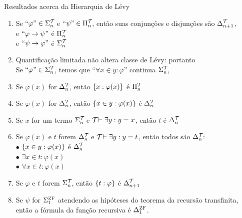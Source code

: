 \begin{theorem}{Resultados acerca da Hierarquia de Lévy}
\begin{enumerate}[label=(\alph*)]
                        \item Se $\text{``}\varphi\text{''}\in\Sigma^{\mathcal{T}_{}}_{n}$ e $\text{``}\psi\text{''}\in\Pi^{\mathcal{T}_{}}_{n}$, então suas conjunções e disjunções
                            são $\Delta^{\mathcal{T}_{}}_{n+1}$,\\ 
                            e $\text{``}\varphi\rightarrow\psi\text{''}$ é $\Pi^{\mathcal{T}_{}}_{n}$\\
                            e $\text{``}\psi\rightarrow\varphi\text{''}$ é $\Sigma^{\mathcal{T}_{}}_{n}$
                        \item Quantificação limitada não altera classe de Lévy: portanto\\
                                Se $\text{``}\varphi\text{''}\in\Sigma^{\mathcal{T}_{}}_{n}$, temos que ``$\forall x\in y:\varphi$'' continua $\Sigma^{\mathcal{T}_{}}_{n}$,
                        \item Se $\varphi(x)$ for         $\Delta^{\mathcal{T}_{}}_{n}$,  então $\SET{x:\varphi(x)}$ é $\Pi^{\mathcal{T}_{}}_{n}$
                        \item Se $\varphi(x)$ for         $\Delta^{\mathcal{T}_{}}_{n}$,  então $\SET{x\in y:\varphi(x)}$ é $\Delta^{\mathcal{T}_{}}_{n}$
                        \item Se $x$ for um termo         $\Sigma^{\mathcal{T}_{}}_{n}$   e $\mathcal{T}_{}\vdash\exists y: y = x$, então $t$ é $\Delta^{\mathcal{T}_{}}_{n}$
                        \item Se $\varphi(x)$ e $t$ forem $\Delta^{\mathcal{T}_{}}_{n}$   e $\mathcal{T}_{}\vdash\exists y: y = t$, então todos são $\Delta^{\mathcal{T}_{}}_{n}$:\\
                                $\bullet$ $\SET{x\in y:\varphi(x)}$ é $\Delta^{\mathcal{T}_{}}_{n}$   \\
                                $\bullet$ $\exists x\in t: \varphi(x)$                          \\
                                $\bullet$ $\forall x\in t: \varphi(x)$                          
                        \item Se $\varphi$ e $t$ forem $\Sigma^{\mathcal{T}_{}}_{n}$, então $\SET{t:\varphi}$ é $\Delta^{\mathcal{T}_{}}_{n+1}$
                        \item Se $\psi$ for $\Sigma^{\text{\sc ZF}}_{1}$ atendendo as hipóteses do teorema da recursão transfinita, então a fórmula da função recursiva é 
                        $\Delta^{\text{\sc ZF}}_{1}$.
                    \end{enumerate}

\end{theorem}
